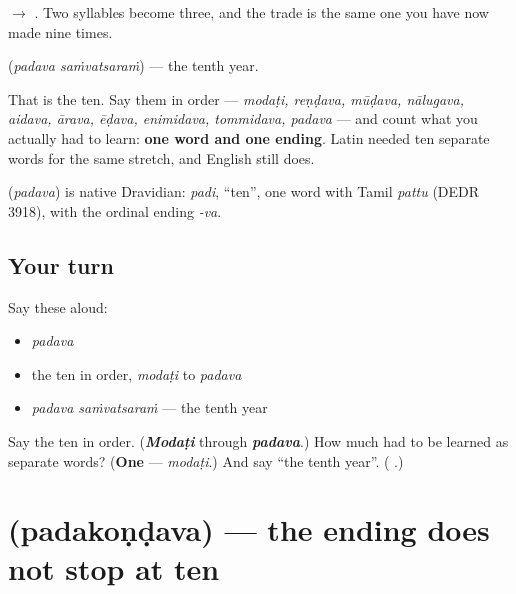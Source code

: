 \textbf{} $\to$ \textbf{}. Two syllables become three, and the trade is the same one you have now made nine times.

\textbf{ } (\emph{padava saṁvatsaraṁ}) — the tenth year.

That is the ten. Say them in order — \emph{modaṭi, reṇḍava, mūḍava, nālugava, aidava, ārava, ēḍava, enimidava, tommidava, padava} — and count what you actually had to learn: \textbf{one word and one ending}. Latin needed ten separate words for the same stretch, and English still does.

\begin{cousinweb}
\textbf{} (\emph{padava}) is native Dravidian: \emph{padi}, \textquotedblleft{}ten\textquotedblright{}, one word with Tamil \emph{pattu} (DEDR 3918), with the ordinal ending \emph{-va}.
\end{cousinweb}

\subsection*{Your turn}
Say these aloud:

\begin{itemize}
\raggedright
  \item \emph{padava}
  \item the ten in order, \emph{modaṭi} to \emph{padava}
  \item \emph{padava saṁvatsaraṁ} — the tenth year
\end{itemize}

\begin{tcolorbox}[breakable,colback=teal!4,colframe=teal!35!black,title={Before you move on}]
Say the ten in order. (\emph{\textbf{Modaṭi}} through \emph{\textbf{padava}}.) How much had to be learned as separate words? (\textbf{One} — \emph{modaṭi}.) And say \textquotedblleft{}the tenth year\textquotedblright{}. (\textbf{ }.)
\end{tcolorbox}
\section[\texorpdfstring{\te{పదకొండవ} (padakoṇḍava)}{పదకొండవ (padakoṇḍava)}]{ (padakoṇḍava) — the ending does not stop at ten}

\label{lesson:TE-C82-eleventh}



